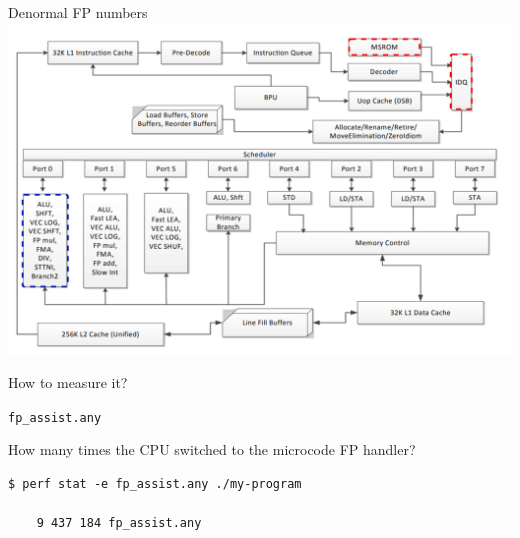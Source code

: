 \documentclass[hyperref={pdfpagelabels=false}]{beamer}
\begin{document}
\begin{frame}{Denormal FP numbers}
	\includegraphics[width=\textwidth]{haswell-diagram6}
\end{frame}
\begin{frame}[fragile, t]{How to measure it?}
	\begin{center}
		{\Large \texttt{fp\_assist.any}}

		How many times the CPU switched to the microcode FP handler?
	\end{center}

	\begin{tcolorbox}
	\begin{verbatim}
$ perf stat -e fp_assist.any ./my-program

	9 437 184 fp_assist.any
	\end{verbatim}
	\end{tcolorbox}
\end{frame}
\end{document}
